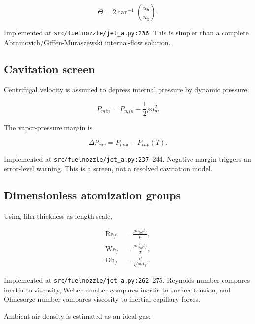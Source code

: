 \documentclass[11pt]{article}
\newcommand{\srcline}[2]{\nolinkurl{#1:#2}}
\begin{document}
\begin{equation}
  \Theta=2\tan^{-1}\left(\frac{u_\theta}{u_z}\right).
  \label{eq:jet-cone-angle}
\end{equation}

Implemented at \srcline{src/fuelnozzle/jet_a.py}{236}. This is simpler than a
complete Abramovich/Giffen-Muraszewski internal-flow solution.

\subsection{Cavitation screen}

Centrifugal velocity is assumed to depress internal pressure by dynamic pressure:

\begin{equation}
  P_{min}=P_{n,in}-\frac{1}{2}\rho u_\theta^2.
  \label{eq:jet-minimum-pressure}
\end{equation}

The vapor-pressure margin is

\begin{equation}
  \Delta P_{cav}=P_{min}-P_{vap}(T).
  \label{eq:cavitation-margin}
\end{equation}

Implemented at \srcline{src/fuelnozzle/jet_a.py}{237}--244. Negative margin
triggers an error-level warning. This is a screen, not a resolved cavitation model.

\subsection{Dimensionless atomization groups}

Using film thickness as length scale,

\begin{align}
  \mathrm{Re}_f &= \frac{\rho u_{tot}t_f}{\mu}, \\
  \mathrm{We}_f &= \frac{\rho u_{tot}^2t_f}{\sigma}, \\
  \mathrm{Oh}_f &= \frac{\mu}{\sqrt{\rho\sigma t_f}}.
  \label{eq:jet-dimensionless}
\end{align}

Implemented at \srcline{src/fuelnozzle/jet_a.py}{262}--275.
Reynolds number compares inertia to viscosity, Weber number compares inertia to
surface tension, and Ohnesorge number compares viscosity to inertial-capillary forces.

Ambient air density is estimated as an ideal gas:
\end{document}
